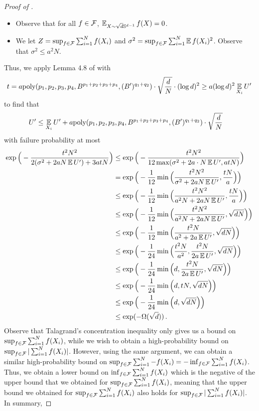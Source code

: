 \begin{proof}[Proof of ]
\begin{itemize}
    \item Observe that for all $f \in \mathcal{F}$, $\operatorname*{\mathbb{E}}_{X \sim \sqrt{d} \mathbb{S}^{d - 1}} f(X) = 0$. 
    \item We let $Z = \sup_{f \in \mathcal{F}} \sum_{i = 1}^N f(X_i)$ and $\sigma^2 = \sup_{f \in \mathcal{F}} \sum_{i = 1}^N \operatorname*{\mathbb{E}} f(X_i)^2$. Observe that $\sigma^2 \leq a^2 N$.
\end{itemize}
Thus, we apply Lemma 4.8 of \citet{ALPT2009_concentration} with 
\begin{align}
t = a \textup{poly}(p_1, p_2, p_3, p_4, B^{p_1 + p_2 + p_3 + p_4}, (B')^{q_1 + q_2}) \cdot \sqrt{\frac{d}{N}} \cdot (\log d)^2
\geq a (\log d)^2 \operatorname*{\mathbb{E}}_{X_i} {U'}
\end{align}
to find that
\begin{align}
{U'}
& \leq \operatorname*{\mathbb{E}}_{X_i} {U'} + a \textup{poly}(p_1, p_2, p_3, p_4, B^{p_1 + p_2 + p_3 + p_4}, (B')^{q_1 + q_2}) \cdot \sqrt{\frac{d}{N}}
\end{align}
with failure probability at most
\begin{align}
\exp\Big(-\frac{t^2 N^2}{2(\sigma^2 + 2 a N \operatorname*{\mathbb{E}} {U'}) + 3atN}\Big)
& \leq \exp\Big(-\frac{t^2N^2}{12 \max(\sigma^2 + 2 a \cdot N \operatorname*{\mathbb{E}} {U'}, atN)}\Big) \\
& = \exp\Big(-\frac{1}{12} \min\Big(\frac{t^2N^2}{\sigma^2 + 2a N \operatorname*{\mathbb{E}} {U'}}, \frac{tN}{a}\Big)\Big) \\
& \leq \exp\Big(-\frac{1}{12} \min\Big(\frac{t^2 N^2}{a^2 N + 2 a N \operatorname*{\mathbb{E}} U'}, \frac{tN}{a} \Big)\Big) \\
& \leq \exp\Big(-\frac{1}{12} \min\Big(\frac{t^2 N^2}{a^2 N + 2 a N \operatorname*{\mathbb{E}} U'}, \sqrt{dN} \Big)\Big) \\
& \leq \exp\Big(-\frac{1}{12} \min\Big(\frac{t^2 N}{a^2 + 2 a \operatorname*{\mathbb{E}} U'}, \sqrt{dN} \Big)\Big) \\
& \leq \exp\Big(-\frac{1}{24} \min\Big(\frac{t^2 N}{a^2}, \frac{t^2 N}{2 a \operatorname*{\mathbb{E}} U'}, \sqrt{dN} \Big)\Big) \\
& \leq \exp\Big(-\frac{1}{24} \min\Big(d, \frac{t^2 N}{2 a \operatorname*{\mathbb{E}} U'}, \sqrt{dN} \Big)\Big) \\
& \leq \exp\Big(-\frac{1}{24} \min\Big(d, tN, \sqrt{dN} \Big)\Big) \\
& \leq \exp\Big(-\frac{1}{24} \min\Big(d, \sqrt{dN} \Big)\Big) \\
& \leq \exp(-\Omega(\sqrt{d})) \,.
\end{align}
Observe that Talagrand's concentration inequality only gives us a bound on $\sup_{f \in \mathcal{F}} \sum_{i = 1}^N f(X_i)$, while we wish to obtain a high-probability bound on $\sup_{f \in \mathcal{F}} |\sum_{i = 1}^N f(X_i)|$. However, using the same argument, we can obtain a similar high-probability bound on $\sup_{f \in \mathcal{F}} \sum_{i = 1}^N -f(X_i) = -\inf_{f \in \mathcal{F}} \sum_{i = 1}^N f(X_i)$. Thus, we obtain a lower bound on $\inf_{f \in \mathcal{F}} \sum_{i = 1}^N f(X_i)$ which is the negative of the upper bound that we obtained for $\sup_{f \in \mathcal{F}} \sum_{i = 1}^N f(X_i)$, meaning that the upper bound we obtained for $\sup_{f \in \mathcal{F}} \sum_{i = 1}^N f(X_i)$ also holds for $\sup_{f \in \mathcal{F}} | \sum_{i = 1}^N f(X_i) |$. In summary,

\end{proof}

